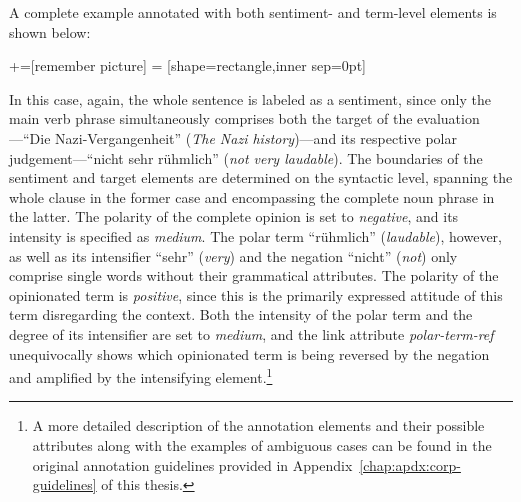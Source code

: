 A complete example annotated with both sentiment- and term-level
elements is shown below:
\begin{example}\label{snt:exmp:sent-anno2}
  +=[remember picture]
   = [shape=rectangle,inner sep=0pt]
  \upshape{}\\[2.2em]
  \noindent{}

\end{example}
In this case, again, the whole sentence is labeled as a sentiment,
since only the main verb phrase simultaneously comprises both the
target of the evaluation---``Die Nazi-Vergangenheit'' (\emph{The Nazi
  history})---and its respective polar judgement---``nicht sehr
r\"uhmlich'' (\emph{not very laudable}).  The boundaries of the
sentiment and target elements are determined on the syntactic level,
spanning the whole clause in the former case and encompassing the
complete noun phrase in the latter.  The polarity of the complete
opinion is set to \emph{negative}, and its intensity is specified as
\emph{medium}.  The polar term ``r\"uhmlich''
(\emph{laudable}), however, as well as its intensifier ``sehr''
(\emph{very}) and the negation ``nicht'' (\emph{not}) only comprise
single words without their grammatical attributes.  The polarity of
the opinionated term is \emph{positive}, since this is the primarily
expressed attitude of this term disregarding the context.  Both the
intensity of the polar term and the degree of its
intensifier are set to \emph{medium}, and the link attribute
\emph{polar-term-ref} unequivocally shows which opinionated term
is being reversed by the negation and amplified by the intensifying
element.\footnote{A more detailed description of the annotation
  elements and their possible attributes along with the examples of
  ambiguous cases can be found in the original annotation guidelines
  provided in Appendix~\ref{chap:apdx:corp-guidelines} of this thesis.}

